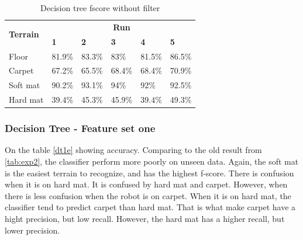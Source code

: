 \documentclass[USenglish]{ifimaster}  %
\begin{document}
	\begin{table}[h]
		\centering
		\begin{tabular}{@{}llllll@{}}
			\toprule
			\multirow{2}{*}{\textbf{Terrain}} & \multicolumn{5}{c}{\textbf{Run}} \\ \cmidrule(l){2-6} 
			& \multicolumn{1}{l|}{\textbf{1}} & \multicolumn{1}{l|}{\textbf{2}} & \multicolumn{1}{l|}{\textbf{3}} & \multicolumn{1}{l|}{\textbf{4}} & \textbf{5} \\ \midrule
			\multicolumn{1}{l|}{Floor} & \multicolumn{1}{l|}{81.9\%} & \multicolumn{1}{l|}{83.3\%} & \multicolumn{1}{l|}{83\%} & \multicolumn{1}{l|}{81.5\%} & 86.5\% \\ \midrule
			\multicolumn{1}{l|}{Carpet} & \multicolumn{1}{l|}{67.2\%} & \multicolumn{1}{l|}{65.5\%} & \multicolumn{1}{l|}{68.4\%} & \multicolumn{1}{l|}{68.4\%} & 70.9\% \\ \midrule
			\multicolumn{1}{l|}{Soft mat} & \multicolumn{1}{l|}{90.2\%} & \multicolumn{1}{l|}{93.1\%} & \multicolumn{1}{l|}{94\%} & \multicolumn{1}{l|}{92\%} & 92.5\% \\ \midrule
			\multicolumn{1}{l|}{Hard mat} & \multicolumn{1}{l|}{39.4\%} & \multicolumn{1}{l|}{45.3\%} & \multicolumn{1}{l|}{45.9\%} & \multicolumn{1}{l|}{39.4\%} & 49.3\% \\ \bottomrule
		\end{tabular}
		\caption{Decision tree fscore without filter}
		\label{dtfscore}
	\end{table}
	\FloatBarrier
	
\subsubsection{Decision Tree - Feature set one}
On the table \ref{dt1e} showing accuracy. Comparing to the old result from \ref{tab:exp2}, the classifier perform more poorly on unseen data. Again, the soft mat is the easiest terrain to recognize, and has the highest f-score. There is confusion when it is on hard mat. It is confused by hard mat and carpet. However, when there is less confusion when the robot is on carpet. When it is on hard mat, the classifier tend to predict carpet than hard mat. That is what make carpet have a hight precision, but low recall. However, the hard mat has a higher recall, but lower precision.  
	
\end{document}
